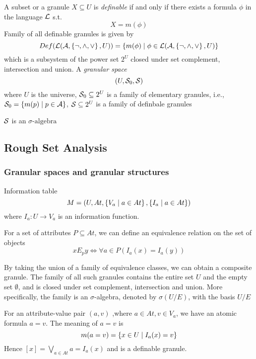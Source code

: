 \documentclass[11pt]{article}
\begin{document}
A subset or a granule \(X\subseteq U\) is \emph{definable} if and only if there
exists a formula \(\phi\) in the language \(\mathcal{L}\) s.t.
\begin{equation*}
X=m(\phi)
\end{equation*}
Family of all definable granules is given by
\begin{equation*}
Def(\mathcal{L}(\mathcal{A},\left\{\neg,\wedge,\vee\right\},U))=\left\{ m(\phi)\mid\phi\in\mathcal{L}
(\mathcal{A},\left\{\neg,\wedge,\vee\right\},U)\right\}
\end{equation*}
which is a subsystem of the power set \(2^U\) closed under set complement,
intersection and union. A \emph{granular space}
\begin{equation*}
(U,\mathcal{S}_0,\mathcal{S})
\end{equation*}
where \(U\) is the universe, \(\mathcal{S}_0\subseteq 2^U\) is a family of elementary
granules, i.e., \(\mathcal{S}_0=\left\{ m(p)\mid p\in\mathcal{A}\right\}\), \(\mathcal{S}\subseteq 2^U\) is
a family of definbale granules

\(\mathcal{S}\) is an \(\sigma\text{-algebra}\)
\subsection{Rough Set Analysis}
\label{sec:orge2af3cf}
\subsubsection{Granular spaces and granular structures}
\label{sec:orgbe971db}
Information table
\begin{equation*}
M=(U,At,\left\{ V_a\mid a\in At\right\},\left\{ I_a\mid a\in At\right\})
\end{equation*}
where \(I_a:U\to V_a\) is an information function.

For a set of attributes \(P\subseteq At\), we can define an equivalence
relation on the set of objects
\begin{equation*}
xE_py\Longleftrightarrow\forall a\in P(I_a(x)=I_a(y))
\end{equation*}

By taking the union of a family of equivalence classes, we can obtain a
composite granule. The family of all such granules contains the entire set \(U\)
and the empty set \(\emptyset\), and is closed under set complement,
intersection and 
union. More specifically, the family is an \(\sigma\)-algebra, denoted by \(\sigma(U/E)\),
with the basis \(U/E\)

For an attribute-value pair \((a,v)\) ,where \(a\in At, v\in V_a\), we have an
atomic formula \(a=v\). The meaning of \(a=v\) is
\begin{equation*}
m(a=v)=\left\{ x\in U\mid I_a(x)=v\right\}
\end{equation*}
Hence \([x]=\bigvee_{a\in At}a=I_a(x)\) and is a definable granule.
\end{document}
